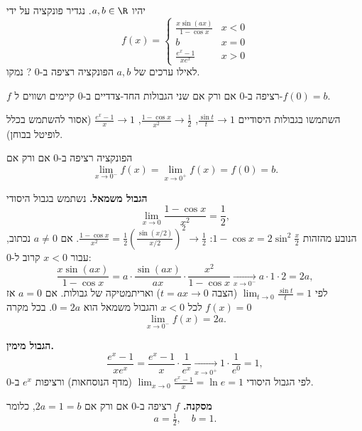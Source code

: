 
\begin{question}
יהיו $a,b\in\R$. נגדיר פונקציה על ידי
\[
f(x)=\begin{cases}
\frac{x\sin(ax)}{1-\cos x} & x<0\\
b & x=0\\
\frac{e^x-1}{xe^x} & x>0
\end{cases}
\]
לאילו ערכים של $a,b$ הפונקציה רציפה ב-$0$ ? נמקו.
\end{question}

\begin{hint}
$f$ רציפה ב-0 אם ורק אם שני הגבולות החד-צדדיים ב-0 קיימים ושווים ל-$f(0)=b$.
\end{hint}

\begin{hint}
השתמשו בגבולות היסודיים $\frac{\sin t}{t}\to1$, $\frac{1-\cos x}{x^2}\to\frac12$, $\frac{e^x-1}{x}\to1$ (אסור להשתמש בכלל לופיטל בבוחן).
\end{hint}

\begin{solution}
הפונקציה רציפה ב-0 אם ורק אם
\[
\lim_{x\to0^-}f(x)=\lim_{x\to0^+}f(x)=f(0)=b .
\]

\textbf{הגבול משמאל.} נשתמש בגבול היסודי
\[
\lim_{x\to0}\frac{1-\cos x}{x^2}=\frac12 ,
\]
הנובע מהזהות $1-\cos x=2\sin^2\frac x2$: $\frac{1-\cos x}{x^2}=\frac12\left(\frac{\sin(x/2)}{x/2}\right)^2\to\frac12$.
אם $a\neq0$ נכתוב, עבור $x<0$ קרוב ל-0:
\[
\frac{x\sin(ax)}{1-\cos x}=a\cdot\frac{\sin(ax)}{ax}\cdot\frac{x^2}{1-\cos x}\xrightarrow[x\to0^-]{}a\cdot1\cdot2=2a ,
\]
לפי $\lim_{t\to0}\frac{\sin t}{t}=1$ (הצבה $t=ax\to0$) ואריתמטיקה של גבולות.
אם $a=0$ אז $f(x)=0$ לכל $x<0$ והגבול משמאל הוא $0=2a$. בכל מקרה
\[
\lim_{x\to0^-}f(x)=2a .
\]

\textbf{הגבול מימין.}
\[
\frac{e^x-1}{xe^x}=\frac{e^x-1}{x}\cdot\frac{1}{e^x}\xrightarrow[x\to0^+]{}1\cdot\frac{1}{e^0}=1 ,
\]
לפי הגבול היסודי $\lim_{x\to0}\frac{e^x-1}{x}=\ln e=1$ (מדף הנוסחאות) ורציפות $e^x$ ב-0.

\textbf{מסקנה.} $f$ רציפה ב-0 אם ורק אם $2a=1=b$, כלומר
\[
\boxed{a=\tfrac12,\quad b=1.}
\]
\end{solution}
